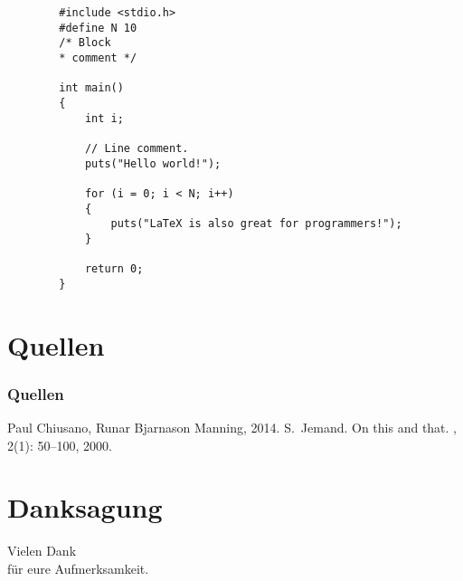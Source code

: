 \documentclass[12pt,utf8]{beamer}
\begin{document}

	\lstset{escapechar=@,style=customc}   
	\begin{lstlisting}
		#include <stdio.h>
		#define N 10
		/* Block
 		* comment */

		int main()
		{
    		int i;

    		// Line comment.
    		puts("Hello world!");
    
    		for (i = 0; i < N; i++)
    		{
        		puts("LaTeX is also great for programmers!");
    		}

    		return 0;
		}
	\end{lstlisting}


	
	\section[Section]{Quellen}
	\begin{frame}[allowframebreaks]
  		\frametitle<presentation>{Quellen}    
  		\begin{thebibliography}{10}    
  		\beamertemplatebookbibitems
    		Paul Chiusano,
    		Runar Bjarnason
    	\newblock Manning, 2014.
  		\beamertemplatearticlebibitems
    	S.~Jemand.
    	\newblock On this and that.
    	, 2(1):		50--100, 2000.
  		\end{thebibliography}
	\end{frame}
	
	\section[Section]{Danksagung}
	\begin{frame}
		\vfill
		\begin{center}\begin{Huge}Vielen Dank \\[10pt]
			für eure Aufmerksamkeit.\end{Huge}\vfill
		\end{center}
		\vfill
	\end{frame}
	
\end{document}
